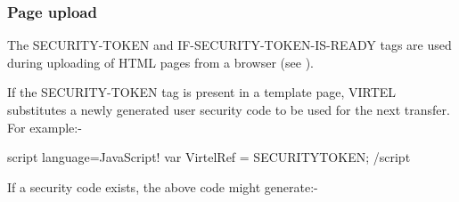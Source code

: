 \documentclass[letterpaper,10pt,english]{sphinxmanual}
\begin{document}
\subsubsection{Page upload}
\label{\detokenize{User_Guide:page-upload}}

The SECURITY-TOKEN and IF-SECURITY-TOKEN-IS-READY tags are used during uploading of HTML pages from a browser (see {\hyperref[\detokenize{User_Guide:v457ug-http-uploading-pages}]{}}).


\begin{sphinxVerbatim}[commandchars=\\\{\}]
  
\end{sphinxVerbatim}

If the SECURITY-TOKEN tag is present in a template page, VIRTEL substitutes a newly generated user security code to be used for the next transfer. For example:-

\begin{sphinxVerbatim}[commandchars=\\\{\}]
\PYGZlt{}script language=\PYGZdq{}JavaScript\PYGZdq{}\PYGZgt{}\PYGZlt{}!\PYGZhy{}\PYGZhy{}
var VirtelRef = \PYGZdq{}\PYGZob{}\PYGZob{}\PYGZob{}SECURITY\PYGZhy{}TOKEN\PYGZcb{}\PYGZcb{}\PYGZcb{}\PYGZdq{};
\PYGZhy{}\PYGZhy{}\PYGZgt{}\PYGZlt{}/script\PYGZgt{}
\end{sphinxVerbatim}

If a security code exists, the above code might generate:-

\begin{sphinxVerbatim}[commandchars=\\\{\}]
   
\end{sphinxVerbatim}

\begin{sphinxVerbatim}[commandchars=\\\{\}]
   
\end{sphinxVerbatim}

\begin{sphinxVerbatim}[commandchars=\\\{\}]
   
\end{sphinxVerbatim}
\end{document}
